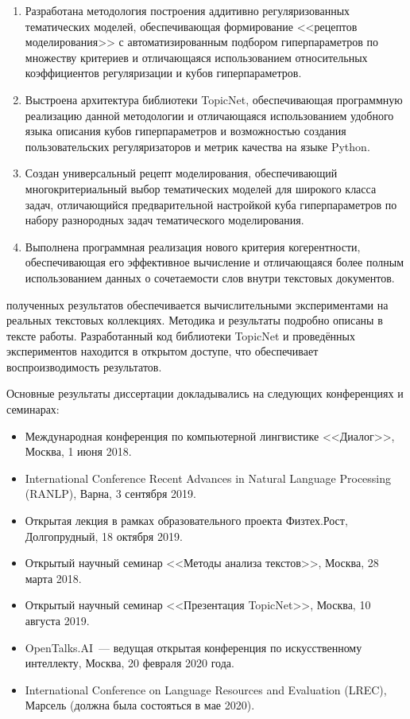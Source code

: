 {}
\begin{enumerate}[beginpenalty=10000] %
\item
    Разработана методология построения аддитивно регуляризованных тематических моделей, обеспечивающая формирование <<рецептов моделирования>> с автоматизированным подбором гиперпараметров по множеству критериев и отличающаяся использованием относительных коэффициентов регуляризации и кубов гиперпараметров.
\item
    Выстроена архитектура библиотеки TopicNet, обеспечивающая программную реализацию данной методологии и отличающаяся использованием удобного языка описания кубов гиперпараметров и возможностью создания пользовательских регуляризаторов и метрик качества на языке Python.
\item
    Создан универсальный рецепт моделирования, обеспечивающий многокритериальный выбор тематических моделей для широкого класса задач, отличающийся предварительной настройкой куба гиперпараметров по набору разнородных задач тематического моделирования.
\item
    Выполнена программная реализация нового критерия когерентности, обеспечивающая его эффективное вычисление и отличающаяся более полным использованием данных о сочетаемости слов внутри текстовых документов.
\end{enumerate}

{\reliability} полученных результатов обеспечивается вычислительными экспериментами на реальных текстовых коллекциях. Методика и результаты подробно описаны в тексте работы. Разработанный код библиотеки TopicNet и проведённых экспериментов находится в открытом доступе, что обеспечивает воспроизводимость результатов.

{\probation}
Основные результаты диссертации докладывались на следующих конференциях и семинарах:
\begin{itemize}
    \item Международная конференция по компьютерной лингвистике <<Диалог>>, Москва, 1 июня 2018.
    \item International Conference Recent Advances in Natural Language Processing (RANLP), Варна, 3 сентября 2019.
    \item Открытая лекция в рамках образовательного проекта Физтех.Рост, Долгопрудный, 18 октября 2019.
    \item Открытый научный семинар <<Методы анализа текстов>>, Москва, 28 марта 2018.
    \item Открытый научный семинар <<Презентация TopicNet>>, Москва, 10 августа 2019.
    \item OpenTalks.AI~--- ведущая открытая конференция по искусственному интеллекту, Москва, 20 февраля 2020 года.
    \item International Conference on Language Resources and Evaluation (LREC), Марсель (должна была состояться в мае 2020).
\end{itemize}

